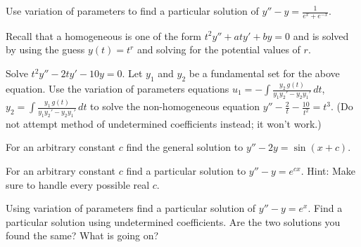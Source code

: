 \begin{exercise}
Use variation of parameters to
find a particular solution of $y''-y = \frac{1}{e^x+e^{-x}}$.
\end{exercise}

\begin{exercise}
Recall that a homogeneous \emph{} is one of the form $t^2y'' + aty' + by = 0$ and is solved by using the guess $y(t) = t^r$ and solving for the potential values of $r$. 
\begin{tasks}
\task Solve $t^2y''-2ty'-10y=0$. %
\task Let $y_1$ and $y_2$ be a fundamental set for the above equation. Use the variation of parameters equations $\displaystyle u_1=-\int \frac{y_2\, g(t)}{y_1y_2' - y_2y_1'}\,dt$, $\displaystyle y_2=\int \frac{y_1\, g(t)}{y_1y_2' - y_2y_1'}\,dt$ to solve the non-homogeneous equation $\displaystyle y''-\frac{2}{t} - \frac{10}{t^2}=t^3$. \hfill\break (Do not attempt method of undetermined coefficients instead; it won't work.)
\end{tasks}
\end{exercise}

\begin{exercise}
For an arbitrary constant $c$ find the general solution
to $y''-2y=\sin(x+c)$.
\end{exercise}

\begin{exercise}
For an arbitrary constant $c$ find a particular solution
to $y''-y=e^{cx}$.  Hint: Make sure to handle every possible real $c$.
\end{exercise}

\begin{exercise} \label{exercise:diffvarparunder}
\pagebreak[2]
\leavevmode
\begin{tasks}
\task Using variation of parameters find a particular solution of
$y''-y = e^x$.
\task Find a particular solution using undetermined
coefficients.
\task Are the two solutions you found the same?
What is going on?
\end{tasks}
\end{exercise}

\setcounter{exercise}{100}
